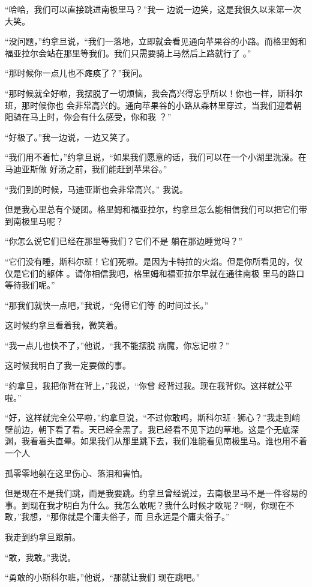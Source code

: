 \documentclass{article}
\begin{document}
“哈哈，我们可以直接跳进南极里马？”我一
边说一边笑，这是我很久以来第一次大笑。 

“没问题，”约拿旦说，“我们一落地，立即就会看见通向苹果谷的小路。而格里姆和福亚拉尔会站在那里等我们。我们只需要骑上马然后上路就行了
。” 


“那时候你一点儿也不瘫痪了？”我问。 

“那时候就全好啦，我摆脱了一切烦恼，我会高兴得忘乎所以！你也一样，斯科尔班，那时候你也
\newpage
会非常高兴的。通向苹果谷的小路从森林里穿过，当我们迎着朝阳骑在马上时，你会有什么感受，你和我
？” 


“好极了。”我一边说，一边又笑了。 

“我们用不着忙，”约拿旦说，“如果我们愿意的话，我们可以在一个小湖里洗澡。在马迪亚斯做
好汤之前，我们能赶到苹果谷。” 

“我们到的时候，马迪亚斯也会非常高兴。”
我说。 

但是我心里总有个疑团。格里姆和福亚拉尔，约拿旦怎么能相信我们可以把它们带到南极里马呢？

“你怎么说它们已经在那里等我们？它们不是
躺在那边睡觉吗？” 

“它们没有睡，斯科尔班！它们死啦。是因为卡特拉的火焰。但是你所看见的，仅仅是它们的躯体
\newpage
。请你相信我吧，格里姆和福亚拉尔早就在通往南极
里马的路口等待我们呢。” 

“那我们就快一点吧，”我说，“免得它们等
的时间过长。” 


这时候约拿旦看着我，微笑着。 

“我一点儿也快不了，”他说，“我不能摆脱
病魔，你忘记啦？” 


这时候我明白了我一定要做的事。 

“约拿旦，我把你背在背上，”我说，“你曾
经背过我。现在我背你。这样就公平啦。” 

“好，这样就完全公平啦，”约拿旦说，“不过你敢吗，斯科尔班·狮心？”我走到峭壁前边，朝下看了看。天已经全黑了。我已经看不见下边的草地。这是个无底深渊，我看着头直晕。如果我们从那里跳下去，我们准能看见南极里马。谁也用不着一个人
\newpage

孤零零地躺在这里伤心、落泪和害怕。 

但是现在不是我们跳，而是我要跳。约拿旦曾经说过，去南极里马不是一件容易的事。到现在我才明白为什么。我怎么敢呢？我什么时候才敢呢？“啊，你现在不敢，”我想，“那你就是个庸夫俗子，而
且永远是个庸夫俗子。” 


我走到约拿旦跟前。 


“敢，我敢。”我说。 

“勇敢的小斯科尔班，”他说，“那就让我们
现在跳吧。” 
\end{document}
